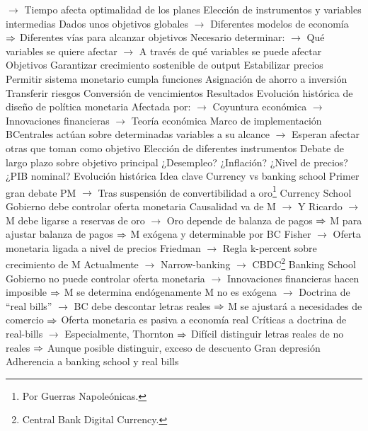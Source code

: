 \documentclass{nuevotema}
\begin{document}
\begin{esquemal}
				\4[] $\to$ Tiempo afecta optimalidad de los planes
				\4 Elección de instrumentos y variables intermedias
				\4[] Dados unos objetivos globales
				\4[] $\to$ Diferentes modelos de economía
				\4[] $\Rightarrow$ Diferentes vías para alcanzar objetivos
				\4[] Necesario determinar:
				\4[] $\to$ Qué variables se quiere afectar
				\4[] $\to$ A través de qué variables se puede afectar
			\3 Objetivos
				\4 Garantizar crecimiento sostenible de output
				\4 Estabilizar precios
				\4 Permitir sistema monetario cumpla funciones
				\4[] Asignación de ahorro a inversión
				\4[] Transferir riesgos
				\4[] Conversión de vencimientos
			\3 Resultados
				\4 Evolución histórica de diseño de política monetaria
				\4[] Afectada por:
				\4[] $\to$ Coyuntura económica
				\4[] $\to$ Innovaciones financieras
				\4[] $\to$ Teoría económica
				\4 Marco de implementación
				\4[] BCentrales actúan sobre determinadas variables a su alcance
				\4[] $\to$ Esperan afectar otras que toman como objetivo
				\4 Elección de diferentes instrumentos
				\4 Debate de largo plazo sobre objetivo principal
				\4[] ¿Desempleo?
				\4[] ¿Inflación?
				\4[] ¿Nivel de precios?
				\4[] ¿PIB nominal?
		\2 Evolución histórica
			\3 Idea clave
				\4 Currency vs banking school
				\4[] Primer gran debate PM
				\4[] $\to$ Tras suspensión de convertibilidad a oro\footnote{Por Guerras Napoleónicas.}
			\3 Currency School
				\4 Gobierno debe controlar oferta monetaria
				\4[] Causalidad va de M $\to$ Y
				\4 Ricardo
				\4[] $\to$ M debe ligarse a reservas de oro
				\4[] $\to$ Oro depende de balanza de pagos
				\4[] $\Rightarrow$ M para ajustar balanza de pagos
				\4[] $\Rightarrow$ M exógena y determinable por BC
				\4 Fisher
				\4[] $\to$ Oferta monetaria ligada a nivel de precios
				\4 Friedman
				\4[] $\to$ Regla k-percent sobre crecimiento de M
				\4 Actualmente
				\4[] $\to$ Narrow-banking
				\4[] $\to$ CBDC\footnote{Central Bank Digital Currency.}
			\3 Banking School
				\4 Gobierno no puede controlar oferta monetaria
				\4[] $\to$ Innovaciones financieras hacen imposible
				\4[] $\Rightarrow$ M se determina endógenamente
				\4 M no es exógena
				\4[] $\to$ Doctrina de ``real bills''
				\4[] $\to$ BC debe descontar letras reales
				\4[] $\Rightarrow$ M se ajustará a necesidades de comercio
				\4[] $\Rightarrow$ Oferta monetaria es pasiva a economía real
				\4 Críticas a doctrina de real-bills
				\4[] $\to$ Especialmente, Thornton
				\4[] $\Rightarrow$ Difícil distinguir letras reales de no reales
				\4[] $\Rightarrow$ Aunque posible distinguir, exceso de descuento
			\3 Gran depresión
				\4[] Adherencia a banking school y real bills

\end{esquemal}
\end{document}
